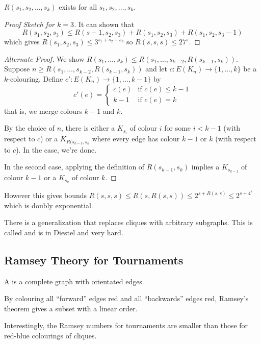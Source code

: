 \documentclass[main.tex]{subfiles}
\begin{document}
\begin{theorem}
  $R(s_1,s_2,\ldots,s_k)$ exists for all $s_1,s_2,\ldots,s_k$.
\end{theorem}
\begin{proof}[Proof Sketch for $k=3$]
  It can shown that
  \[
    R(s_1,s_2,s_3)\leq R(s-1,s_2,s_3) + R(s_1,s_2,s_3) + R(s_1,s_2,s_3-1)
  \]
  which gives $R(s_1,s_2,s_3)\leq 3^{s_1+s_2+s_3}$ so $R(s,s,s)\leq 27^s$.
\end{proof}
\begin{proof}[Alternate Proof]
  We show $R(s_1,\ldots,s_k)\leq R(s_1,\ldots, s_{k-2}, R(s_{k-1}, s_k))$.
  Suppose $n\geq R(s_1,\ldots,s_{k-2},R(s_{k-1},s_k))$ and let
  $c:E(K_n)\to\{1,\ldots,k\}$ be a $k$-colouring.
  Define $c':E(K_n)\to\{1,\ldots,k-1\}$ by
  \[
    c'(e) = \begin{cases}
      c(e) & \text{if }c(e)\leq k-1 \\
      k-1 & \text{if } c(e) = k
    \end{cases}
  \]
  that is, we merge colours $k-1$ and $k$.

  By the choice of $n$, there is either a $K_{s_i}$ of colour $i$ for some
  $i < k-1$ (with respect to $c$) or a $K_{R(s_{k-1}, s_k}$ where every edge
  has colour $k-1$ or $k$ (with respect to $c$).
  In the case, we're done.

  In the second case, applying the definition of $R(s_{k-1},s_k)$ implies a
  $K_{s_{k-1}}$ of colour $k-1$ or a $K_{s_k}$ of colour $k$.
\end{proof}
However this gives bounds
$R(s,s,s)\leq R(s,R(s,s))\leq 2^{s + R(s,s)}\leq 2^{s + 4^s}$
which is doubly exponential.

\begin{remark*}
  There is a generalization that replaces cliques with arbitrary subgraphs.
  This is called  and is in Diestel and very hard.
\end{remark*}

\subsection{Ramsey Theory for Tournaments}
\begin{definition*}
  A  is a complete graph with orientated edges.
\end{definition*}
By colouring all ``forward'' edges red and all ``backwards'' edges red,
Ramsey's theorem gives a subset with a linear order.

Interestingly, the Ramsey numbers for tournaments are smaller than those
for red-blue colourings of cliques.
\end{document}
